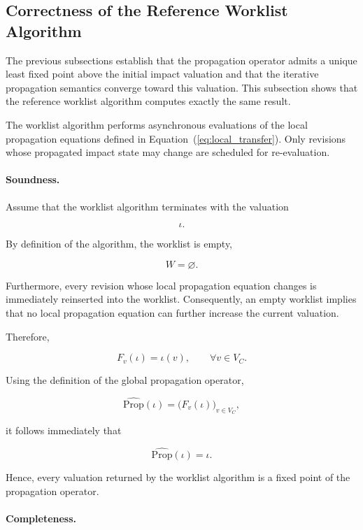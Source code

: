 \documentclass[10pt]{article}
\begin{document}
\subsection{Correctness of the Reference Worklist Algorithm}

The previous subsections establish that the propagation operator admits a
unique least fixed point above the initial impact valuation and that the
iterative propagation semantics converge toward this valuation. This subsection
shows that the reference worklist algorithm computes exactly the same result.

The worklist algorithm performs asynchronous evaluations of the local
propagation equations defined in
Equation~(\ref{eq:local_transfer}).
Only revisions whose propagated impact state may change are scheduled for
re-evaluation.

\paragraph{Soundness.}

Assume that the worklist algorithm terminates with the valuation

\[
\iota.
\]

By definition of the algorithm, the worklist is empty,

\[
W=\varnothing.
\]

Furthermore, every revision whose local propagation equation changes is
immediately reinserted into the worklist. Consequently, an empty worklist
implies that no local propagation equation can further increase the current
valuation.

Therefore,

\[
F_v(\iota)
=
\iota(v),
\qquad
\forall v\in V_C.
\]

Using the definition of the global propagation operator,

\[
\widehat{\mathrm{Prop}}(\iota)
=
\bigl(
F_v(\iota)
\bigr)_{v\in V_C},
\]

it follows immediately that

\begin{equation}
	\label{eq:worklist_soundness}
	\widehat{\mathrm{Prop}}(\iota)
	=
	\iota.
\end{equation}

Hence, every valuation returned by the worklist algorithm is a fixed point of the propagation operator.

\paragraph{Completeness.}
\end{document}
